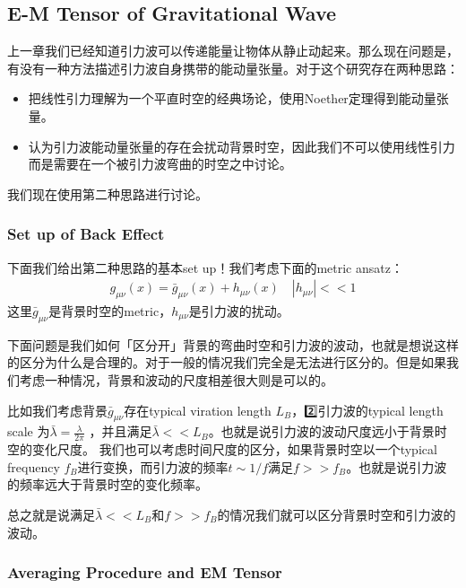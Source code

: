 
\subsection{E-M Tensor of Gravitational Wave}
上一章我们已经知道引力波可以传递能量让物体从静止动起来。那么现在问题是，有没有一种方法描述引力波自身携带的能动量张量。对于这个研究存在两种思路：
\begin{itemize}
  \item 把线性引力理解为一个平直时空的经典场论，使用Noether定理得到能动量张量。
  \item 认为引力波能动量张量的存在会扰动背景时空，因此我们不可以使用线性引力而是需要在一个被引力波弯曲的时空之中讨论。
\end{itemize}
我们现在使用第二种思路进行讨论。

\subsubsection{Set up of Back Effect}


下面我们给出第二种思路的基本set up！我们考虑下面的metric ansatz：
\begin{align}
  g_{\mu\nu}(x)=\bar{g}_{\mu\nu}(x)+h_{\mu\nu}(x)\quad |h_{\mu\nu}|<<1
\end{align}
这里$ \bar{g}_{\mu\nu} $是背景时空的metric，$ h_{\mu\nu} $是引力波的扰动。

\bigskip
{}

下面问题是我们如何「区分开」背景的弯曲时空和引力波的波动，也就是想说这样的区分为什么是合理的。对于一般的情况我们完全是无法进行区分的。但是如果我们考虑一种情况，背景和波动的尺度相差很大则是可以的。

比如我们考虑背景$ \bar{g}_{\mu \nu} $存在typical viration length $ L_B
$，2️⃣引力波的typical length scale 为$ \bar{\lambda} = \frac{\lambda}{2
\pi}$ ，并且满足$ \bar{\lambda} << L_B $。也就是说引力波的波动尺度远小于背景时空的变化尺度。
我们也可以考虑时间尺度的区分，如果背景时空以一个typical frequency $ f_B $进行变换，而引力波的频率$ t \sim
1/f $满足$ f >> f_B $。也就是说引力波的频率远大于背景时空的变化频率。

总之就是说满足$ \bar{\lambda} << L_B $和$ f >> f_B $的情况我们就可以区分背景时空和引力波的波动。

\subsubsection{Averaging Procedure and EM Tensor}

